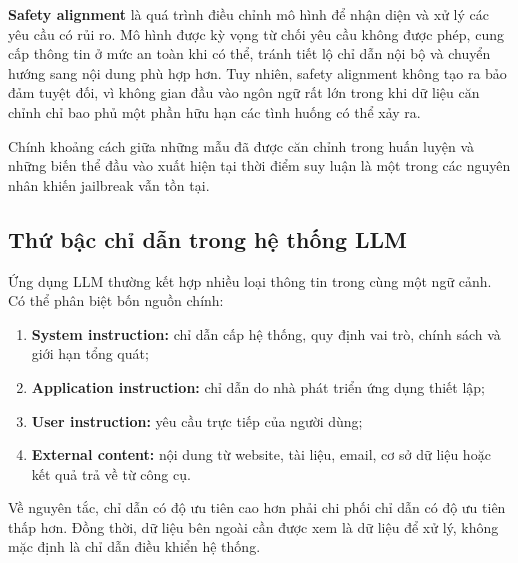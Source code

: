 \textbf{Safety alignment} là quá trình điều chỉnh mô hình để nhận diện và
xử lý các yêu cầu có rủi ro. Mô hình được kỳ vọng từ chối yêu cầu không
được phép, cung cấp thông tin ở mức an toàn khi có thể, tránh tiết lộ chỉ
dẫn nội bộ và chuyển hướng sang nội dung phù hợp hơn. Tuy nhiên, safety
alignment không tạo ra bảo đảm tuyệt đối, vì không gian đầu vào ngôn ngữ
rất lớn trong khi dữ liệu căn chỉnh chỉ bao phủ một phần hữu hạn các tình
huống có thể xảy ra.

Chính khoảng cách giữa những mẫu đã được căn chỉnh trong huấn luyện và
những biến thể đầu vào xuất hiện tại thời điểm suy luận là một trong các
nguyên nhân khiến jailbreak vẫn tồn tại.

\subsection{Thứ bậc chỉ dẫn trong hệ thống LLM}
\label{subsec:instruction-hierarchy}

Ứng dụng LLM thường kết hợp nhiều loại thông tin trong cùng một ngữ cảnh.
Có thể phân biệt bốn nguồn chính:

\begin{enumerate}[leftmargin=1.2cm]
    \item \textbf{System instruction:}
    chỉ dẫn cấp hệ thống, quy định vai trò, chính sách và giới hạn tổng quát;

    \item \textbf{Application instruction:}
    chỉ dẫn do nhà phát triển ứng dụng thiết lập;

    \item \textbf{User instruction:}
    yêu cầu trực tiếp của người dùng;

    \item \textbf{External content:}
    nội dung từ website, tài liệu, email, cơ sở dữ liệu hoặc kết quả trả về
    từ công cụ.
\end{enumerate}

Về nguyên tắc, chỉ dẫn có độ ưu tiên cao hơn phải chi phối chỉ dẫn có độ
ưu tiên thấp hơn. Đồng thời, dữ liệu bên ngoài cần được xem là dữ liệu để
xử lý, không mặc định là chỉ dẫn điều khiển hệ thống.

